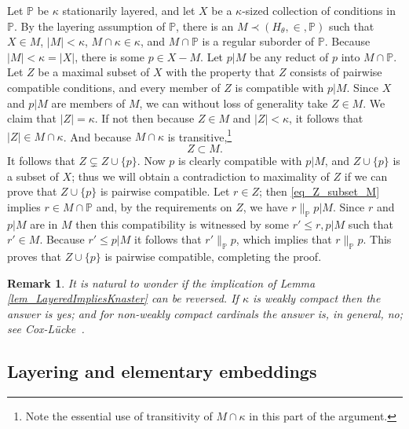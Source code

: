 \documentclass{amsart}
\newtheorem{remark}[theorem]{Remark}
\begin{document}
Let $\mathbb{P}$ be $\kappa$ stationarily layered, and let $X$ be a $\kappa$-sized collection of conditions in $\mathbb{P}$.  By the layering assumption of $\mathbb{P}$, there is an $M \prec (H_\theta, \in, \mathbb{P})$ such that $X \in M$, $|M|<\kappa$, $M \cap \kappa\in \kappa$, and $M \cap \mathbb{P}$ is a regular suborder of $\mathbb{P}$.  Because $|M|<\kappa=|X|$, there is some $p \in X - M$.  Let $p|M$ be any reduct of $p$ into $M \cap \mathbb{P}$.  Let $Z$ be a maximal subset of $X$ with the property that $Z$ consists of pairwise compatible conditions, and every member of $Z$ is compatible with $p|M$.  Since $X$ and $p|M$ are members of $M$, we can without loss of generality take $Z \in M$.  We claim that $|Z| = \kappa$.  If not then because $Z \in M$ and $|Z|<\kappa$, it follows that $|Z| \in M \cap \kappa$.  And because $M \cap \kappa$ is transitive,\footnote{Note the essential use of transitivity of $M \cap \kappa$ in this part of the argument.}
\begin{equation}\label{eq_Z_subset_M}
Z \subset M.
\end{equation}
It follows that $Z \subsetneq Z \cup \{ p \}$.  Now $p$ is clearly compatible with $p|M$, and $Z \cup \{ p \}$ is a subset of $X$; thus we will obtain a contradiction to maximality of $Z$ if we can prove that $Z \cup \{ p \}$ is pairwise compatible.  Let $r \in Z$; then \eqref{eq_Z_subset_M} implies $r \in M \cap \mathbb{P}$ and, by the requirements on $Z$, we have $r \parallel_{\mathbb{P}} p|M$.  Since $r$ and $p|M$ are in $M$ then this compatibility is witnessed by some $r' \le r, p|M$ such that $r' \in M$.  Because $r' \le p|M$ it follows that $r' \parallel_{\mathbb{P}} p$, which implies that $r \parallel_{\mathbb{P}} p$.  This proves that $Z \cup \{ p \}$ is pairwise compatible, completing the proof.


\begin{remark}
It is natural to wonder if the implication of Lemma \ref{lem_LayeredImpliesKnaster} can be reversed.  If $\kappa$ is weakly compact then the answer is yes; and for non-weakly compact cardinals the answer is, in general, no; see Cox-L\"ucke~\cite{Cox_Luecke}.
\end{remark}





\subsection{Layering and elementary embeddings}\label{sec_LayeringElementaryEmbeddings}
\end{document}
